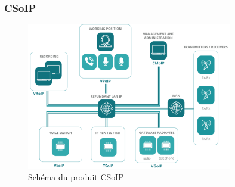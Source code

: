 \begin{frame}
    \frametitle{CSoIP}
    \begin{figure}
        \centering
        \includegraphics[width=0.8\textwidth]{./img/CSoIP.png}
        \caption{Schéma du produit CSoIP}
    \end{figure}
\end{frame}